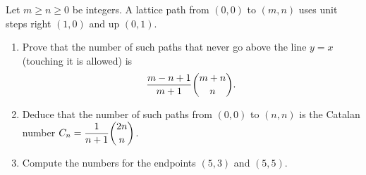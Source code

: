 Let $m\ge n\ge0$ be integers. A lattice path from $(0,0)$ to $(m,n)$ uses unit steps right $(1,0)$ and up $(0,1)$.
\begin{enumerate}
\item[(a)] Prove that the number of such paths that never go above the line $y=x$ (touching it is allowed) is
\[\dfrac{m-n+1}{m+1}\dbinom{m+n}{n}.\]
\item[(b)] Deduce that the number of such paths from $(0,0)$ to $(n,n)$ is the Catalan number $C_n=\dfrac{1}{n+1}\dbinom{2n}{n}$.
\item[(c)] Compute the numbers for the endpoints $(5,3)$ and $(5,5)$.
\end{enumerate}
